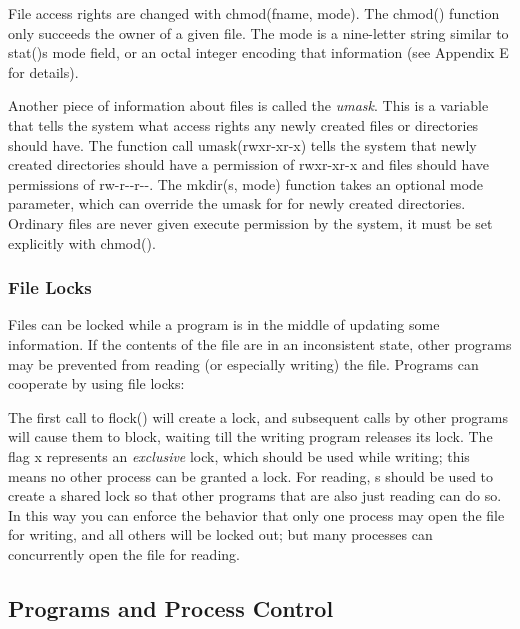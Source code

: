 File access rights are changed with \textsf{chmod(fname, mode)}. The
\textsf{chmod()} function only succeeds the owner of a
given file. The \textsf{mode} is a nine-letter string similar to
\textsf{stat()}{\textquotesingle}s mode field, or an octal integer
encoding that information (see Appendix E for details).

Another piece of information about files is called the
\textit{umask}. This is a variable that tells the system
what access rights any newly created files or directories should have.
The function call
\textsf{umask({\textquotedbl}rwxr-xr-x{\textquotedbl})} tells the
system that newly created directories should have a permission of
\textsf{{\textquotedbl}rwxr-xr-x{\textquotedbl}} and files should have
permissions of \textsf{{\textquotedbl}rw-r-{}-r-{}-{\textquotedbl}}.
The \textsf{mkdir(s, mode)} function takes an optional mode parameter,
which can override the umask for for newly created directories.
Ordinary files are never given execute permission by the system, it
must be set explicitly with \textsf{chmod()}.

\subsubsection{File Locks}

Files can be locked while a program is in the middle of
updating some information. If the contents of the file are in an
inconsistent state, other programs may be prevented from reading (or
especially writing) the file. Programs can cooperate by using file
locks:


The first call to \textsf{flock()} will create a lock, and subsequent
calls by other programs will cause them to block, waiting till the
writing program releases its lock. The flag
\textsf{{\textquotedbl}x{\textquotedbl}} represents an
\textit{exclusive} lock, which should be used while writing; this means
no other process can be granted a lock. For reading,
\textsf{{\textquotedbl}s{\textquotedbl}} should be used to create a
shared lock so that other programs that are also just reading can do
so. In this way you can enforce the behavior that only one process may
open the file for writing, and all others will be locked out; but many
processes can concurrently open the file for reading.

\subsection{Programs and Process Control}


